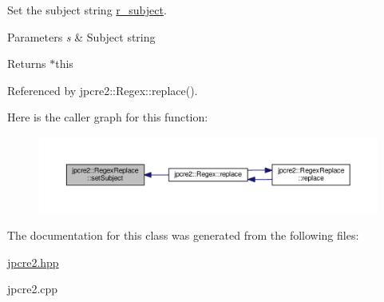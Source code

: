 Set the subject string \hyperlink{classjpcre2_1_1RegexReplace_a2290e5d9f1c2336abd431fef97e72c93}{r\+\_\+subject}. 


\begin{DoxyParams}{Parameters}
{\em s} & Subject string \\
\hline
\end{DoxyParams}
\begin{DoxyReturn}{Returns}
$\ast$this 
\end{DoxyReturn}


Referenced by jpcre2\+::\+Regex\+::replace().



Here is the caller graph for this function\+:\nopagebreak
\begin{figure}[H]
\begin{center}
\leavevmode
\includegraphics[width=350pt]{classjpcre2_1_1RegexReplace_a46eefdb105827920bebc8436721fa4cb_icgraph}
\end{center}
\end{figure}




The documentation for this class was generated from the following files\+:\begin{DoxyCompactItemize}
\item 
\hyperlink{jpcre2_8hpp}{jpcre2.\+hpp}\item 
jpcre2.\+cpp\end{DoxyCompactItemize}
